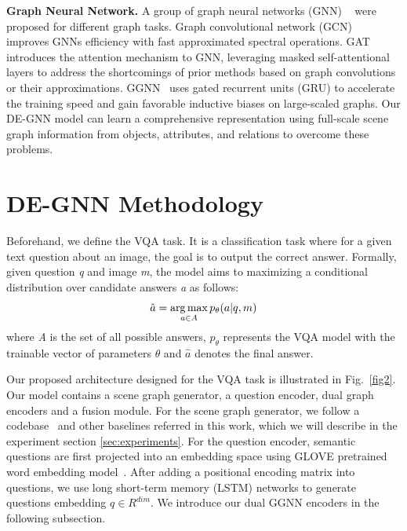 \documentclass[letterpaper]{article} %
\begin{document}
\vspace{0.05in}
\noindent\textbf{Graph Neural Network.}
A group of graph neural networks (GNN) ~\cite{DBLP:journals/tnn/ScarselliGTHM09,DBLP:conf/cncl/WangGCL16,DBLP:conf/aaai/WangCGL18,DBLP:conf/aistats/SunL19,DBLP:conf/aaai/0001RFHLRG19,DBLP:conf/aaai/LiuCLZLSQ19} were proposed for different graph tasks.
Graph convolutional network (GCN)~\cite{DBLP:conf/iclr/KipfW17} improves GNNs efficiency with fast approximated spectral operations. 
GAT~\cite{DBLP:conf/iclr/VelickovicCCRLB18} introduces the attention mechanism to GNN, leveraging masked self-attentional layers to address the shortcomings of prior methods based on graph convolutions or their approximations. GGNN~\cite{DBLP:journals/corr/LiTBZ15} uses gated recurrent units (GRU) to accelerate the training speed and gain favorable inductive biases on large-scaled graphs.
Our DE-GNN model can learn a comprehensive representation using full-scale scene graph information from objects, attributes, and relations to overcome these problems.


\section{DE-GNN Methodology}

Beforehand, we define the VQA task. 
It is a classification task where for a given text question about an image, the goal is to output the correct answer. 
Formally, given question \emph{q} and image \emph{m}, the model aims to maximizing a conditional distribution over candidate answers \emph{a} as follows:
\begin{equation}\notag
    \hat{a} = \mathop{\arg\max}_{a \in A}p_\theta(a|q, m)
\end{equation}
where \emph{A} is the set of all possible answers, $p_\theta$ represents the VQA model with the trainable vector of parameters $\theta$ and $\hat{a}$ denotes the final answer.

Our proposed architecture designed for the VQA task is illustrated in Fig.~\ref{fig2}. 
Our model contains a scene graph generator, a question encoder, dual graph encoders and a fusion module. For the scene graph generator, we follow a codebase~\cite{tang2020sggcode} and other baselines referred in this work, which we will describe in the experiment section \ref{sec:experiments}. 
For the question encoder, semantic questions are first projected into an embedding space using GLOVE pretrained word embedding model~\cite{pennington-etal-2014-glove}. 
After adding a positional encoding matrix into questions, we use long short-term memory (LSTM) networks to generate questions embedding $q \in R^{dim}$. 
We introduce our dual GGNN encoders in the following subsection.
\end{document}
